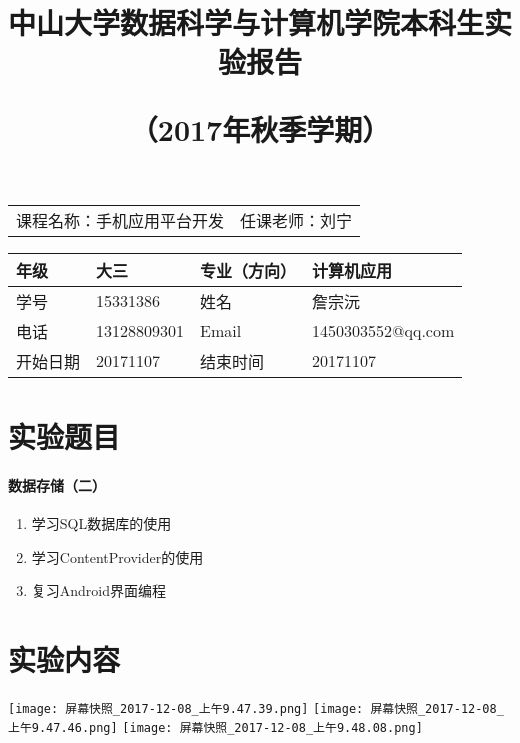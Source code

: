 \documentclass[UTF8]{ctexart}
\title{中山大学数据科学与计算机学院本科生实验报告\\
	\begin{large}
	（2017年秋季学期）
	\end{large}}
\begin{document}
\maketitle
\begin{center}
        \begin{tabularx}{\textwidth}{X R}
        	课程名称：手机应用平台开发& 任课老师：刘宁\\
	\end{tabularx}
	
        \begin{tabularx}{\textwidth}{|X|X|X|X|}
        	\hline
        	年级& 大三& 专业（方向）& 计算机应用\\
        	\hline
        	学号& 15331386& 姓名& 詹宗沅\\
        	\hline
        	电话& 13128809301& Email& 1450303552@qq.com\\
        	\hline
        	开始日期& 20171107& 结束时间& 20171107\\
        	\hline
        \end{tabularx}
\end{center}



\section{实验题目}
\paragraph{数据存储（二） }
\begin{enumerate}
\item 学习SQL数据库的使用
\item 学习ContentProvider的使用
\item 复习Android界面编程 
\end{enumerate}


\section{实验内容}
\begin{center}
\texttt{[image: 屏幕快照\_2017-12-08\_上午9.47.39.png]}
\texttt{[image: 屏幕快照\_2017-12-08\_上午9.47.46.png]}
\texttt{[image: 屏幕快照\_2017-12-08\_上午9.48.08.png]}
\end{center}
\end{document}
